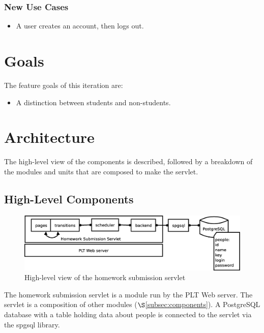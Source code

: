 \documentclass[a4paper]{article}
\begin{document}
\subsubsection{New Use Cases}\label{subsubsec:newusecases}
\begin{itemize}
\item{A user creates an account, then logs out.}
\end{itemize}

\section{Goals}\label{sec:goals}

The feature goals of this iteration are:

\begin{itemize}
\item{A distinction between students and non-students.}
\end{itemize}

\section{Architecture}\label{sec:arch}

The high-level view of the components is described, followed by a breakdown of
the modules and units that are composed to make the servlet.

\subsection{High-Level Components}\label{subsec:high-level}

\begin{figure}[ht]
\centering
\includegraphics[scale=.35]{architecture.eps}
\caption{High-level view of the homework submission servlet}
\label{fig:architecture}
\end{figure}

The homework submission servlet is a module run by the PLT Web server. The
servlet is a composition of other modules ($\S$\ref{subsec:components}). A
PostgreSQL database with a table holding data about people is connected to the
servlet via the spgsql library.
\end{document}
